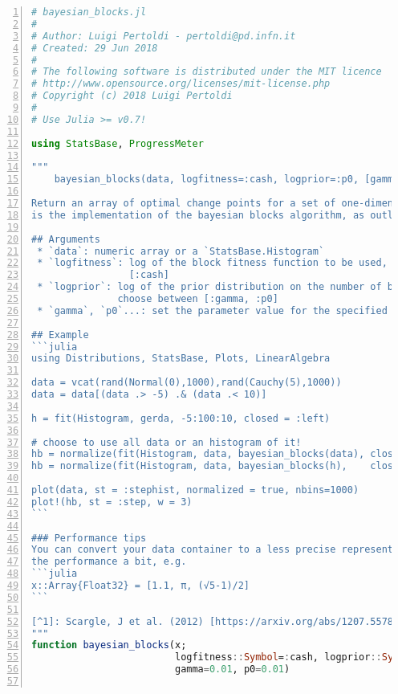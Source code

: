 \begin{lstlisting}[language=julia, style=jlcodestyle,
                   basicstyle={\loadcolors\small\ttfamily},
                   numbers=left,
                   stepnumber=1,
                   numberstyle={\color{jlcomment}\footnotesize\ttfamily}]
# bayesian_blocks.jl
#
# Author: Luigi Pertoldi - pertoldi@pd.infn.it
# Created: 29 Jun 2018
#
# The following software is distributed under the MIT licence
# http://www.opensource.org/licenses/mit-license.php
# Copyright (c) 2018 Luigi Pertoldi
#
# Use Julia >= v0.7!

using StatsBase, ProgressMeter

"""
    bayesian_blocks(data, logfitness=:cash, logprior=:p0, [gamma=0.01, p0=0.01])

Return an array of optimal change points for a set of one-dimensional data. This
is the implementation of the bayesian blocks algorithm, as outlined in [^1].

## Arguments
 * `data`: numeric array or a `StatsBase.Histogram`
 * `logfitness`: log of the block fitness function to be used, choose between
                 [:cash]
 * `logprior`: log of the prior distribution on the number of blocks to be used,
               choose between [:gamma, :p0]
 * `gamma`, `p0`...: set the parameter value for the specified prior distribution

## Example
```julia
using Distributions, StatsBase, Plots, LinearAlgebra

data = vcat(rand(Normal(0),1000),rand(Cauchy(5),1000))
data = data[(data .> -5) .& (data .< 10)]

h = fit(Histogram, gerda, -5:100:10, closed = :left)

# choose to use all data or an histogram of it!
hb = normalize(fit(Histogram, data, bayesian_blocks(data), closed = :left))
hb = normalize(fit(Histogram, data, bayesian_blocks(h),    closed = :left))

plot(data, st = :stephist, normalized = true, nbins=1000)
plot!(hb, st = :step, w = 3)
```

### Performance tips
You can convert your data container to a less precise representation to improve
the performance a bit, e.g.
```julia
x::Array{Float32} = [1.1, π, (√5-1)/2]
```

[^1]: Scargle, J et al. (2012) [https://arxiv.org/abs/1207.5578]
"""
function bayesian_blocks(x;
                         logfitness::Symbol=:cash, logprior::Symbol=:p0,
                         gamma=0.01, p0=0.01)


\end{lstlisting}
